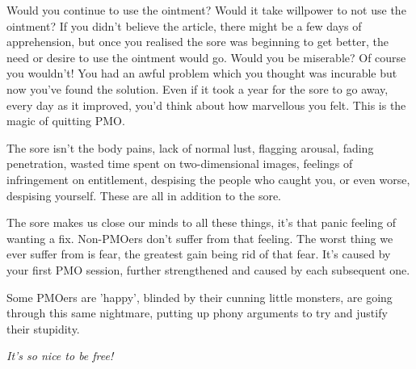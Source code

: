 \documentclass[easypeasy.tex]{subfiles}
\begin{document}
Would you continue to use the ointment? Would it take willpower to not use the ointment? If you didn't believe the article, there might be a few days of apprehension, but once you realised the sore was beginning to get better, the need or desire to use the ointment would go. Would you be miserable? Of course you wouldn't! You had an awful problem which you thought was incurable but now you've found the solution. Even if it took a year for the sore to go away, every day as it improved, you'd think about how marvellous you felt. This is the magic of quitting PMO.

The sore isn't the body pains, lack of normal lust, flagging arousal, fading penetration, wasted time spent on two-dimensional images, feelings of infringement on entitlement, despising the people who caught you, or even worse, despising yourself. These are all in addition to the sore.

The sore makes us close our minds to all these things, it's that panic feeling of wanting a fix. Non-PMOers don't suffer from that feeling. The worst thing we ever suffer from is fear, the greatest gain being rid of that fear. It's caused by your first PMO session, further strengthened and caused by each subsequent one.

Some PMOers are 'happy', blinded by their cunning little monsters, are going through this same nightmare, putting up phony arguments to try and justify their stupidity.

\textit{It's so nice to be free!}
\end{document}
